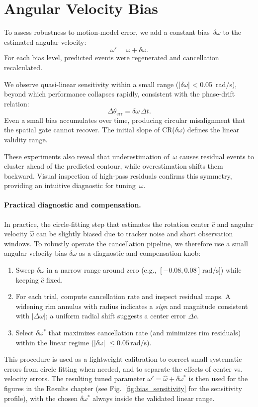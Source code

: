 \section{Angular Velocity Bias}
\label{sec:omega_bias}

To assess robustness to motion-model error, we add a constant bias~\(\delta\omega\) to the estimated angular velocity:
\[
\omega' = \omega + \delta\omega.
\]
For each bias level, predicted events were regenerated and cancellation recalculated.

We observe quasi-linear sensitivity within a small range (|\(\delta\omega\)| < 0.05~rad/s), beyond which performance collapses rapidly, consistent with the phase-drift relation:
\[
\Delta\theta_{\text{err}} = \delta\omega\,\Delta t.
\]
Even a small bias accumulates over time, producing circular misalignment that the spatial gate cannot recover. The initial slope of CR(\(\delta\omega\)) defines the linear validity range.

These experiments also reveal that underestimation of~\(\omega\) causes residual events to cluster ahead of the predicted contour, while overestimation shifts them backward.
Visual inspection of high-pass residuals confirms this symmetry, providing an intuitive diagnostic for tuning~\(\omega\).

\paragraph{Practical diagnostic and compensation.}
In practice, the circle-fitting step that estimates the rotation center \(\hat c\) and angular velocity \(\hat\omega\) can be slightly biased due to tracker noise and short observation windows. To robustly operate the cancellation pipeline, we therefore use a small angular-velocity bias \(\delta\omega\) as a 
diagnostic and compensation knob:
\begin{enumerate}
    \item Sweep \(\delta\omega\) in a narrow range around zero (e.g., \([-0.08, 0.08]\,\text{rad/s}]\)) while keeping \(\hat c\) fixed.
    \item For each trial, compute cancellation rate and inspect residual maps. A widening rim annulus with radius indicates a \emph{sign} and magnitude consistent with \(|\Delta\omega|\); a uniform radial shift suggests a center error \(\Delta c\).
    \item Select \(\delta\omega^{*}\) that maximizes cancellation rate (and minimizes rim residuals) within the linear regime (|\(\delta\omega\)| \(\le 0.05\,\text{rad/s}\)).
\end{enumerate}
This procedure is used as a lightweight calibration to correct small systematic errors from circle fitting when needed, and to separate the effects of center vs. velocity errors. The resulting tuned parameter \(\omega' = \hat\omega + \delta\omega^{*}\) is then used for the figures in the Results chapter (see Fig.~\ref{fig:bias_sensitivity} for the sensitivity profile), with the chosen \(\delta\omega^{*}\) always inside the validated linear range.

